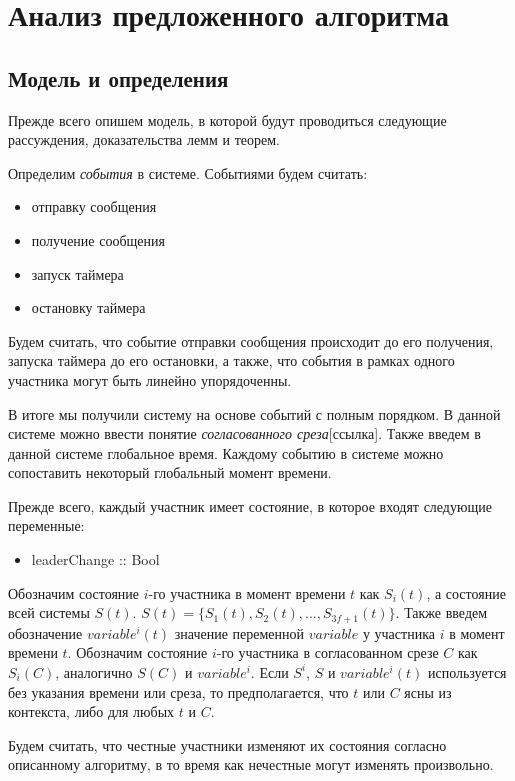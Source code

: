 
\chapter{Анализ предложенного алгоритма}  \label{chapter3}

\section{Модель и определения}
Прежде всего опишем модель, в которой будут проводиться следующие рассуждения, доказательства лемм и теорем.

Определим \textit{события} в системе. Событиями будем считать:
\begin{itemize}
\item отправку сообщения
\item получение сообщения
\item запуск таймера
\item остановку таймера
\end{itemize}

Будем считать, что событие отправки сообщения происходит до его получения, запуска таймера до его остановки, а также, что события в рамках одного участника могут быть линейно упорядоченны.

В итоге мы получили систему на основе событий с полным порядком. В данной системе можно ввести понятие \textit{согласованного среза}[ссылка]. Также введем в данной системе глобальное время. Каждому событию в системе можно сопоставить некоторый глобальный момент времени.

Прежде всего, каждый участник имеет состояние, в которое входят следующие переменные:
\begin{itemize}
\item leaderChange :: Bool
\end{itemize}

Обозначим состояние $i$-го участника в момент времени $t$ как $S_i(t)$, а состояние всей системы $S(t)$. 
$S(t)=\{S_1(t), S_2(t),..., S_{3f+1}(t)\}$. Также введем обозначение $variable^i(t)$ значение переменной $variable$ у участника $i$ в момент времени $t$.
Обозначим состояние $i$-го участника в согласованном срезе $C$ как $S_i(C)$, аналогично $S(C)$ и $variable^i$.
Если $S^i$, $S$ и $variable^i(t)$ используется без указания времени или среза, то предполагается, что $t$ или $C$ ясны из контекста, либо для любых $t$ и $C$.

Будем считать, что честные участники изменяют их состояния согласно описанному алгоритму, в то время как нечестные могут изменять произвольно.

